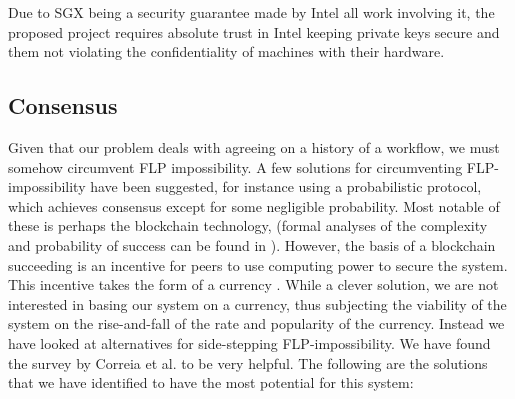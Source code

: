 \documentclass[12pt]{article}
\begin{document}
		Due to SGX being a security guarantee made by Intel all work involving it, the proposed project requires absolute trust in Intel keeping private keys secure and them not violating the confidentiality of machines with their hardware.

		\subsection{Consensus}
		Given that our problem deals with agreeing on a history of a workflow, we must somehow circumvent FLP impossibility.
		A few solutions for circumventing FLP-impossibility have been suggested, for instance using a probabilistic protocol, which achieves consensus except for some negligible probability.
		Most notable of these is perhaps the blockchain technology, (formal analyses of the complexity and probability of success can be found in \cite{miller2014anonymous}).
		However, the basis of a blockchain succeeding is an incentive for peers to use computing power to secure the system.
		This incentive takes the form of a currency \cite{bitcoin-white-paper}.
		While a clever solution, we are not interested in basing our system on a currency, thus subjecting the viability of the system on the rise-and-fall of the rate and popularity of the currency. 
		Instead we have looked at alternatives for side-stepping FLP-impossibility. 
		We have found the survey by Correia et al. \cite{consensus-survey} to be very helpful. 
		The following are the solutions that we have identified to have the most potential for this system:
\end{document}
